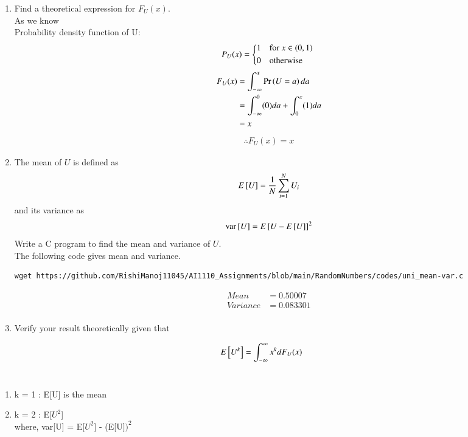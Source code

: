 \documentclass[journal,12pt,twocolumn]{IEEEtran}
\renewcommand\thesection{\arabic{section}}
\begin{document}
\begin{enumerate}[label=\thesection.\arabic*
,ref=\thesection.\theenumi]
%
\item
Find a  theoretical expression for $F_{U}(x)$.\\
\solution As we know \\
Probability density function of U:
\begin{equation}
     P_U(x) = 
    \begin{cases*}
        1 & for $x\in(0,1)$ \\
        0 & otherwise \\
    \end{cases*}
\end{equation}
\begin{align}
    F_U(x) &= \int_{- \infty }^{x} \Pr\left(U=a\right) da\\
     &= \int_{- \infty }^{0} (0) da + \int_{0}^{x} (1) da\\
     &= x
\end{align}
\begin{align}
\therefore F_U(x) = x
\end{align}
\item
The mean of $U$ is defined as
%
\begin{equation}
E{}\left[U\right] = \frac{1}{N}\sum_{i=1}^{N}U_i
\end{equation}
%
and its variance as
%
\begin{equation}
\text{var}{}\left[U\right] = E{}\left[U- E{}\left[U\right]\right]^2 
\end{equation}
Write a C program to  find the mean and variance of $U$.\\
\solution The following code gives mean and variance.
\begin{lstlisting}
wget https://github.com/RishiManoj11045/AI1110_Assignments/blob/main/RandomNumbers/codes/uni_mean-var.c
\end{lstlisting}
\begin{align*}
    Mean &= 0.50007 \\
    Variance &= 0.083301 \\
\end{align*}
\item Verify your result theoretically given that
\end{enumerate}
%
\begin{equation}
E{}\left[U^k\right] = \int_{-\infty}^{\infty}x^kdF_{U}(x)
\end{equation}
%
\solution \\
\begin{enumerate}
    \item k = 1 : E[U] is the mean
    \item k = 2 : E[$U^2$] \\
    where, var[U] = E[$U^2$] - (E[U$])^2$
\end{enumerate}
\end{document}
